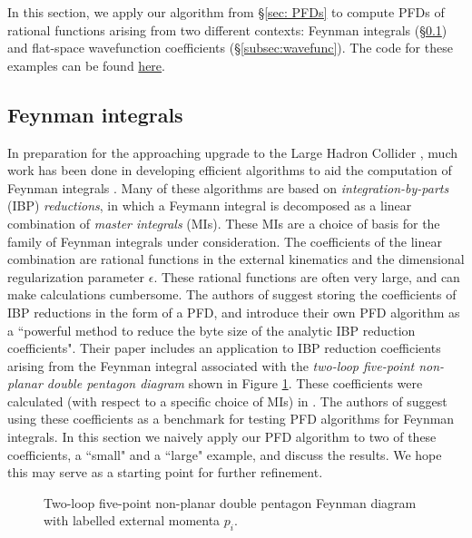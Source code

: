 \documentclass [a4paper,reqno, 11pt]{amsart}
\theoremstyle{plain}
\theoremstyle{plain}
\theoremstyle{plain}
\theoremstyle{plain}
\theoremstyle{definition}
\theoremstyle{definition}
\theoremstyle{definition}
\theoremstyle{definition}
\theoremstyle{definition}
\theoremstyle{definition}
\begin{document}
In this section, we apply our algorithm from \S\ref{sec: PFDs} to compute PFDs of rational functions arising from two different contexts: Feynman integrals (\S\ref{subsec:feynman}) and flat-space wavefunction coefficients (\S\ref{subsec:wavefunc}). The code for these examples can be found \href{https://github.com/CJMDK/PFDs}{here}.

\subsection{Feynman integrals}\label{subsec:feynman}
In preparation for the approaching upgrade to the Large Hadron Collider \cite{AAA+}, much work has been done in developing efficient algorithms to aid the computation of Feynman integrals \cite{HvM,BFP,CGM}. Many of these algorithms are based on \emph{integration-by-parts} (IBP) \textit{reductions}, in which a Feymann integral is decomposed as a linear combination of \emph{master integrals} (MIs). These MIs are a choice of basis for the family of Feynman integrals under consideration. The coefficients of the linear combination are rational functions in the external kinematics and the dimensional regularization parameter $\epsilon$. These rational functions are often very large, and can make calculations cumbersome. The authors of \cite{BWW+} suggest storing the coefficients of IBP reductions in the form of a PFD, and introduce their own PFD algorithm as a ``powerful method to reduce the byte size of the analytic IBP reduction coeﬃcients". Their paper includes an application to IBP reduction coefficients arising from the Feynman integral associated with the \emph{two-loop five-point non-planar double pentagon diagram} shown in Figure \ref{fig: Feynman diagram}. These coefficients were calculated (with respect to a specific choice of MIs) in \cite{BBD+}.
The authors of \cite{HvM} suggest using these coefficients as a benchmark for testing PFD algorithms for Feynman integrals. In this section we naively apply our PFD algorithm to two of these coefficients, a ``small" and a ``large" example, and discuss the results. We hope this may serve as a starting point for further refinement.

\begin{figure}[h]
\centering
{}
\caption{Two-loop five-point non-planar double pentagon Feynman diagram with labelled external momenta $p_i$.}
\label{fig: Feynman diagram}
\end{figure}
\end{document}
